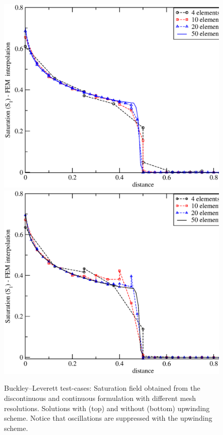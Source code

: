 \begin{figure}[h]
\vbox{
\hbox{\hspace{.3cm}\includegraphics[width=.9\textwidth]{diagrams/bl-dg-4-10-20.eps}}
\vspace{-0.cm}
\hbox{\hspace{.3cm}\includegraphics[width=.9\textwidth]{diagrams/bl-dg-cent-4-10-20.eps}}}
\caption{Buckley--Leverett test-cases: Saturation field obtained from
  the discontinuous and continuous formulation with different mesh
  resolutions. Solutions with (top) and without (bottom) upwinding
  scheme. Notice that oscillations are suppressed with the upwinding
  scheme.\label{bl-dg-cent-4-10-20}}
\end{figure}


